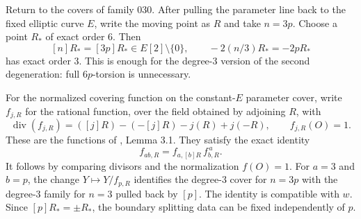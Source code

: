 \documentclass[11pt,a4paper]{article}
\theoremstyle{definition}\newtheorem{definition}[theorem]{Definition}
\theoremstyle{remark}\newtheorem*{remark}{Remark}
\newcommand{\srcM}{\cite{M}}
\begin{document}
Return to the covers of family 030. After pulling the parameter line back
to the fixed elliptic curve $E$, write the moving point as $R$ and take
$n=3p$. Choose a point $R_*$ of exact order 6. Then
\[
 [n]R_*=[3p]R_*\in E[2]\setminus\{0\},\qquad
 -2(n/3)R_*=-2pR_*
\]
has exact order 3. This is enough for the degree-3 version of the second
degeneration: full $6p$-torsion is unnecessary.

For the normalized covering function on the constant-$E$ parameter cover,
write $f_{j,R}$ for the rational function, over the field obtained by adjoining
$R$, with
\[
\operatorname{div}(f_{j,R})=([j]R)-(-[j]R)-j(R)+j(-R),
\qquad f_{j,R}(O)=1.
\]
These are the functions of \srcM, Lemma 3.1. They satisfy the exact identity
\[
 f_{ab,R}=f_{a,[b]R}\,f_{b,R}^{\,a}.
\]
It follows by comparing divisors and the normalization $f(O)=1$.
For $a=3$ and $b=p$, the change $Y\mapsto Y/f_{p,R}$ identifies
the degree-3 cover for $n=3p$ with the degree-3 family for $n=3$
pulled back by $[p]$. The identity is compatible with $w$.
Since $[p]R_*=\pm R_*$, the boundary splitting data can be fixed
independently of $p$.
\end{document}
